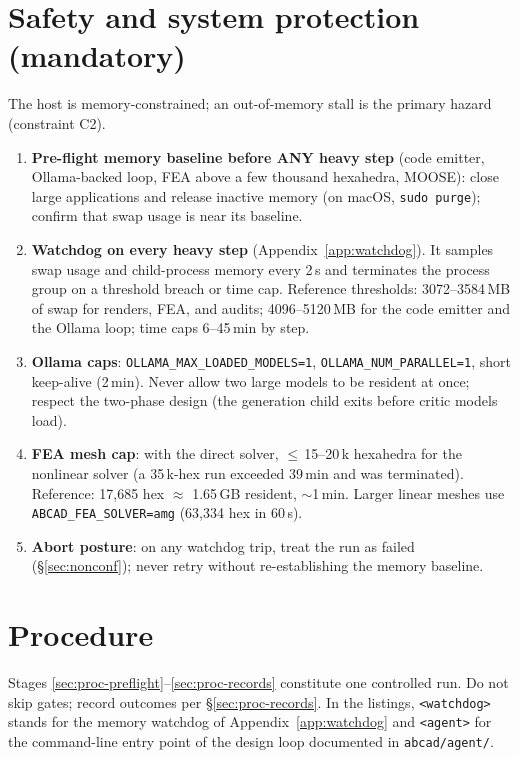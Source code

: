 \documentclass[11pt]{article}
\begin{document}
\section{Safety and system protection (mandatory)}\label{sec:safety}
The host is memory-constrained; an out-of-memory stall is the primary hazard (constraint C2).
\begin{enumerate}[nosep]
  \item \textbf{Pre-flight memory baseline before ANY heavy step} (code emitter, Ollama-backed loop, FEA
        above a few thousand hexahedra, MOOSE): close large applications and release inactive memory
        (on macOS, \texttt{sudo purge}); confirm that swap usage is near its baseline.
  \item \textbf{Watchdog on every heavy step} (Appendix~\ref{app:watchdog}). It samples swap usage and
        child-process memory every 2\,s and terminates the process group on a threshold breach or time
        cap. Reference thresholds: 3072--3584\,MB of swap for renders, FEA, and audits;
        4096--5120\,MB for the code emitter and the Ollama loop; time caps 6--45\,min by step.
  \item \textbf{Ollama caps}: \texttt{OLLAMA\_MAX\_LOADED\_MODELS=1}, \texttt{OLLAMA\_NUM\_PARALLEL=1},
        short keep-alive (2\,min). Never allow two large models to be resident at once; respect the
        two-phase design (the generation child exits before critic models load).
  \item \textbf{FEA mesh cap}: with the direct solver, $\le$\,15--20\,k hexahedra for the nonlinear
        solver (a 35\,k-hex run exceeded 39\,min and was terminated). Reference: 17{,}685 hex
        $\approx$ 1.65\,GB resident, $\sim$1\,min. Larger linear meshes use
        \texttt{ABCAD\_FEA\_SOLVER=amg} (63{,}334 hex in 60\,s).
  \item \textbf{Abort posture}: on any watchdog trip, treat the run as failed (\S\ref{sec:nonconf});
        never retry without re-establishing the memory baseline.
\end{enumerate}

\section{Procedure}\label{sec:proc}
Stages \ref{sec:proc-preflight}--\ref{sec:proc-records} constitute one controlled run. Do not skip
gates; record outcomes per \S\ref{sec:proc-records}. In the listings, \texttt{<watchdog>} stands for
the memory watchdog of Appendix~\ref{app:watchdog} and \texttt{<agent>} for the command-line entry
point of the design loop documented in \texttt{abcad/agent/}.
\end{document}
